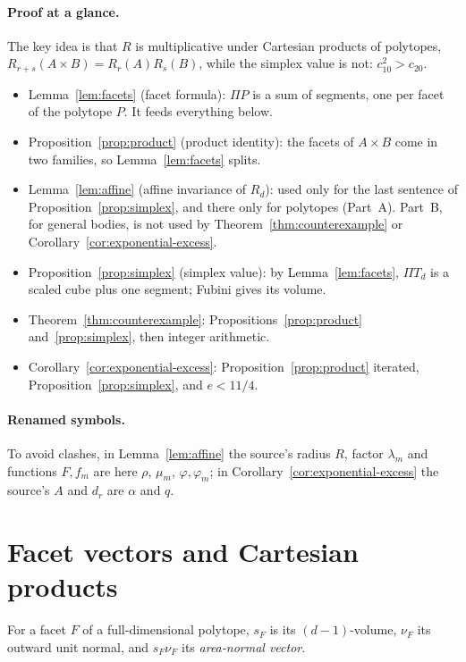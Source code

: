 \documentclass[11pt]{article}
\begin{document}
\paragraph{Proof at a glance.}
The key idea is that \(R\) is multiplicative under Cartesian products of polytopes, \(R_{r+s}(A\times B)=R_r(A)R_s(B)\), while the simplex value is not: \(c_{10}^2>c_{20}\).
\begin{itemize}
\item Lemma~\ref{lem:facets} (facet formula): \(\Pi P\) is a sum of segments, one per facet of the polytope \(P\). It feeds everything below.
\item Proposition~\ref{prop:product} (product identity): the facets of \(A\times B\) come in two families, so Lemma~\ref{lem:facets} splits.
\item Lemma~\ref{lem:affine} (affine invariance of \(R_d\)): used only for the last sentence of Proposition~\ref{prop:simplex}, and there only for polytopes (Part~A). Part~B, for general bodies, is not used by Theorem~\ref{thm:counterexample} or Corollary~\ref{cor:exponential-excess}.
\item Proposition~\ref{prop:simplex} (simplex value): by Lemma~\ref{lem:facets}, \(\Pi T_d\) is a scaled cube plus one segment; Fubini gives its volume.
\item Theorem~\ref{thm:counterexample}: Propositions~\ref{prop:product} and~\ref{prop:simplex}, then integer arithmetic.
\item Corollary~\ref{cor:exponential-excess}: Proposition~\ref{prop:product} iterated, Proposition~\ref{prop:simplex}, and \(e<11/4\).
\end{itemize}

\paragraph{Renamed symbols.} To avoid clashes, in Lemma~\ref{lem:affine} the source's radius \(R\), factor \(\lambda_m\) and functions \(F,f_m\) are here \(\rho\), \(\mu_m\), \(\varphi,\varphi_m\); in Corollary~\ref{cor:exponential-excess} the source's \(A\) and \(d_r\) are \(\alpha\) and \(q\).

\section{Facet vectors and Cartesian products}\label{sec:facets}

For a facet \(F\) of a full-dimensional polytope, \(s_F\) is its \((d-1)\)-volume, \(\nu_F\) its outward unit normal, and \(s_F\nu_F\) its \emph{area-normal vector}.
\end{document}

